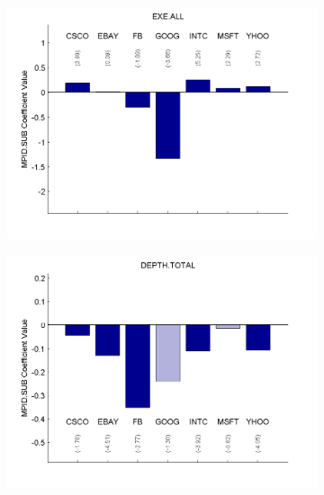 \documentclass{article}
\begin{document}
\begin{figure}[htp!]
\begin{subfigure}{0.31\textwidth}
\includegraphics[width=\linewidth]{docs/Regression_Ratio_30sec_16_MPID_SUB_1MPIDLags_5DepVarLags.pdf}
\end{subfigure}
\begin{subfigure}{0.31\textwidth}
\includegraphics[width=\linewidth]{docs/Regression_Ratio_30sec_21_MPID_SUB_1MPIDLags_5DepVarLags.pdf}
\end{subfigure}
\begin{subfigure}{0.31\textwidth}

\end{subfigure}
\end{figure}
\end{document}
